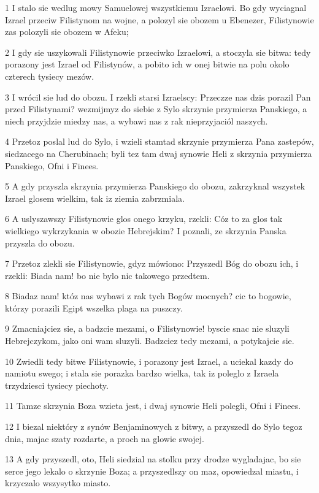 \par 1 I stalo sie wedlug mowy Samuelowej wszystkiemu Izraelowi. Bo gdy wyciagnal Izrael przeciw Filistynom na wojne, a polozyl sie obozem u Ebenezer, Filistynowie zas polozyli sie obozem w Afeku;
\par 2 I gdy sie uszykowali Filistynowie przeciwko Izraelowi, a stoczyla sie bitwa: tedy porazony jest Izrael od Filistynów, a pobito ich w onej bitwie na polu okolo czterech tysiecy mezów.
\par 3 I wrócil sie lud do obozu. I rzekli starsi Izraelscy: Przeczze nas dzis porazil Pan przed Filistynami? wezmijmyz do siebie z Sylo skrzynie przymierza Panskiego, a niech przyjdzie miedzy nas, a wybawi nas z rak nieprzyjaciól naszych.
\par 4 Przetoz poslal lud do Sylo, i wzieli stamtad skrzynie przymierza Pana zastepów, siedzacego na Cherubinach; byli tez tam dwaj synowie Heli z skrzynia przymierza Panskiego, Ofni i Finees.
\par 5 A gdy przyszla skrzynia przymierza Panskiego do obozu, zakrzyknal wszystek Izrael glosem wielkim, tak iz ziemia zabrzmiala.
\par 6 A uslyszawszy Filistynowie glos onego krzyku, rzekli: Cóz to za glos tak wielkiego wykrzykania w obozie Hebrejskim? I poznali, ze skrzynia Panska przyszla do obozu.
\par 7 Przetoz zlekli sie Filistynowie, gdyz mówiono: Przyszedl Bóg do obozu ich, i rzekli: Biada nam! bo nie bylo nic takowego przedtem.
\par 8 Biadaz nam! któz nas wybawi z rak tych Bogów mocnych? cic to bogowie, którzy porazili Egipt wszelka plaga na puszczy.
\par 9 Zmacniajciez sie, a badzcie mezami, o Filistynowie! byscie snac nie sluzyli Hebrejczykom, jako oni wam sluzyli. Badzciez tedy mezami, a potykajcie sie.
\par 10 Zwiedli tedy bitwe Filistynowie, i porazony jest Izrael, a uciekal kazdy do namiotu swego; i stala sie porazka bardzo wielka, tak iz poleglo z Izraela trzydziesci tysiecy piechoty.
\par 11 Tamze skrzynia Boza wzieta jest, i dwaj synowie Heli polegli, Ofni i Finees.
\par 12 I biezal niektóry z synów Benjaminowych z bitwy, a przyszedl do Sylo tegoz dnia, majac szaty rozdarte, a proch na glowie swojej.
\par 13 A gdy przyszedl, oto, Heli siedzial na stolku przy drodze wygladajac, bo sie serce jego lekalo o skrzynie Boza; a przyszedlszy on maz, opowiedzal miastu, i krzyczalo wszysytko miasto.
